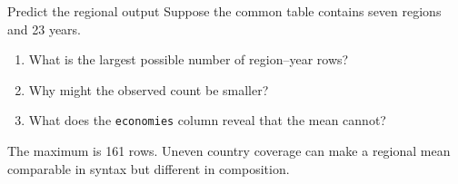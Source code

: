 \begin{frame}{Predict the regional output}
  Suppose the common table contains seven regions and 23 years.

  \begin{enumerate}
    \item What is the largest possible number of region--year rows?
    \item Why might the observed count be smaller?
    \item What does the \texttt{economies} column reveal that the mean cannot?
  \end{enumerate}

  \vfill
  The maximum is 161 rows. Uneven country coverage can make a regional mean
  comparable in syntax but different in composition.
\end{frame}
